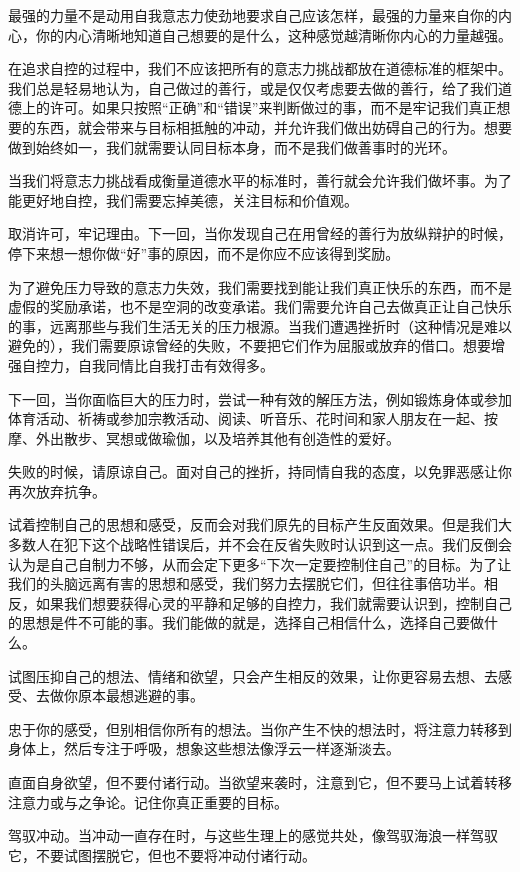 \documentclass[12pt,oneside]{book}
\begin{document}
\begin{bookref}[frametitle={\cite{自控力}}]
最强的力量不是动用自我意志力使劲地要求自己应该怎样，最强的力量来自你的内心，你的内心清晰地知道自己想要的是什么，这种感觉越清晰你内心的力量越强。

在追求自控的过程中，我们不应该把所有的意志力挑战都放在道德标准的框架中。我们总是轻易地认为，自己做过的善行，或是仅仅考虑要去做的善行，给了我们道德上的许可。如果只按照“正确”和“错误”来判断做过的事，而不是牢记我们真正想要的东西，就会带来与目标相抵触的冲动，并允许我们做出妨碍自己的行为。想要做到始终如一，我们就需要认同目标本身，而不是我们做善事时的光环。

当我们将意志力挑战看成衡量道德水平的标准时，善行就会允许我们做坏事。为了能更好地自控，我们需要忘掉美德，关注目标和价值观。

取消许可，牢记理由。下一回，当你发现自己在用曾经的善行为放纵辩护的时候，停下来想一想你做“好”事的原因，而不是你应不应该得到奖励。

为了避免压力导致的意志力失效，我们需要找到能让我们真正快乐的东西，而不是虚假的奖励承诺，也不是空洞的改变承诺。我们需要允许自己去做真正让自己快乐的事，远离那些与我们生活无关的压力根源。当我们遭遇挫折时（这种情况是难以避免的），我们需要原谅曾经的失败，不要把它们作为屈服或放弃的借口。想要增强自控力，自我同情比自我打击有效得多。

下一回，当你面临巨大的压力时，尝试一种有效的解压方法，例如锻炼身体或参加体育活动、祈祷或参加宗教活动、阅读、听音乐、花时间和家人朋友在一起、按摩、外出散步、冥想或做瑜伽，以及培养其他有创造性的爱好。

失败的时候，请原谅自己。面对自己的挫折，持同情自我的态度，以免罪恶感让你再次放弃抗争。

试着控制自己的思想和感受，反而会对我们原先的目标产生反面效果。但是我们大多数人在犯下这个战略性错误后，并不会在反省失败时认识到这一点。我们反倒会认为是自己自制力不够，从而会定下更多“下次一定要控制住自己”的目标。为了让我们的头脑远离有害的思想和感受，我们努力去摆脱它们，但往往事倍功半。相反，如果我们想要获得心灵的平静和足够的自控力，我们就需要认识到，控制自己的思想是件不可能的事。我们能做的就是，选择自己相信什么，选择自己要做什么。

试图压抑自己的想法、情绪和欲望，只会产生相反的效果，让你更容易去想、去感受、去做你原本最想逃避的事。

忠于你的感受，但别相信你所有的想法。当你产生不快的想法时，将注意力转移到身体上，然后专注于呼吸，想象这些想法像浮云一样逐渐淡去。

直面自身欲望，但不要付诸行动。当欲望来袭时，注意到它，但不要马上试着转移注意力或与之争论。记住你真正重要的目标。

驾驭冲动。当冲动一直存在时，与这些生理上的感觉共处，像驾驭海浪一样驾驭它，不要试图摆脱它，但也不要将冲动付诸行动。
\end{bookref}
\end{document}
